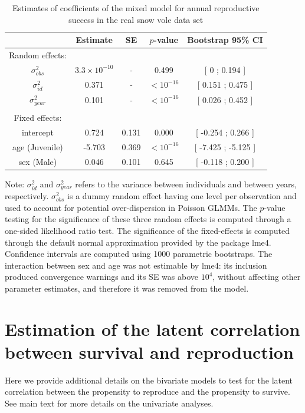 \begin{table}[H]
\caption{Estimates of coefficients of the mixed model for annual reproductive success in the real snow vole data set} 
\label{Rho_table}
\begin{center}
\footnotesize
\begin{tabular}{ccccc}
  \toprule
 & Estimate & SE & $p$-value & Bootstrap 95\% CI  \\ 
  \midrule
	Random effects:\\
$\sigma_{obs}^2$ & $3.3 \times 10^{-10}$ & - & 0.499 & [ 0 ; 0.194 ] \\ 
  $\sigma_{id}^2$ & 0.371 & - & $<10^{-16}$ & [ 0.151 ; 0.475 ] \\ 
  $\sigma_{year}^2$ & 0.101 & - & $<10^{-16}$ & [ 0.026 ; 0.452 ] \\ 
	\\
   Fixed effects:\\
intercept & 0.724 & 0.131 & 0.000 & [ -0.254 ; 0.266 ] \\ 
  age (Juvenile) & -5.703 & 0.369 & $<10^{-16}$ & [ -7.425 ; -5.125 ] \\ 
  sex (Male) & 0.046 & 0.101 & 0.645 & [ -0.118 ; 0.200 ] \\ 
	\bottomrule
\end{tabular}
\end{center}
{\scriptsize Note: $\sigma_{id}^2$ and $\sigma_{year}^2$ refers to the variance between individuals and between years, respectively. $\sigma_{obs}^2$ is a dummy random effect having one level per observation and used to account for potential over-dispersion in Poisson GLMMs. The $p$-value testing for the significance of these three random effects is computed through a one-sided likelihood ratio test. The significance of the fixed-effects is computed through the default normal approximation provided by the package lme4. Confidence intervals are computed using 1000 parametric bootstraps. The interaction between sex and age was not estimable by lme4: its inclusion produced convergence warnings and its SE was above $10^4$, without affecting other parameter estimates, and therefore it was removed from the model.}
\end{table}
\clearpage

\section{Estimation of the latent correlation between survival and reproduction}\label{ap:cor}
Here we provide additional details on the bivariate models to test for the latent correlation between the propensity to reproduce and the propensity to survive. See main text for more details on the univariate analyses.


